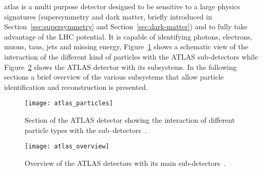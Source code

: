 \gls{atlas} is a multi purpose detector designed to be sensitive to a large
physics signatures (supersymmetry and dark matter, briefly introduced in
Section~\ref{sec:supersymmetry} and Section~\ref{sec:dark-matter}) and to fully
take advantage of the LHC potential. It is capable of identifying photons,
electrons, muons, taus, jets and missing energy,
Figure~\ref{fig:atlas_particles} shows a schematic view of the interaction of
the different kind of particles with the ATLAS sub-detectors while
Figure~\ref{fig:atlas_overview} shows the ATLAS detector with its subsystems. In
the following sections a brief overview of the various subsystems that allow
particle identification and reconstruction is presented.

\begin{figure}[!h]
  \centering
    \texttt{[image: atlas\_particles]}
    \caption{Section of the ATLAS detector showing the interaction of different
      particle types with the sub--detectors~\cite{ATLASCrossSection}.}
    \label{fig:atlas_particles}
\end{figure}
\begin{figure}
  \centering
    \texttt{[image: atlas\_overview]}
    \caption{Overview of the ATLAS detectors with its main
      sub-detectors~\cite{ATLASPaper}.}
    \label{fig:atlas_overview}
\end{figure}
